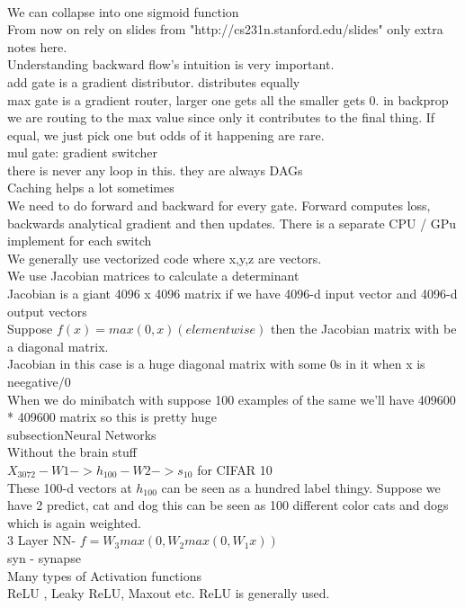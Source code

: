 \documentclass{article}
\begin{document}
\\
\\
\\
\\ \\ \\ \\
\\
\\
\\
\\
We can collapse into one sigmoid function
\\From now on rely on slides from "http://cs231n.stanford.edu/slides"
 only extra notes here.
\\ Understanding backward flow's intuition is very important.
\\ add gate is a gradient distributor. distributes equally
\\ max gate is a gradient router, larger one gets all the smaller gets 0. in backprop we are routing to the max value since only it contributes to the final thing. If equal, we just pick one but odds of it happening are rare.
\\ mul gate: gradient switcher
\\ there is never any loop in this. they are always DAGs
\\ Caching helps a lot sometimes
\\We need to do forward and backward for every gate. Forward computes loss, backwards analytical gradient and then updates. There is a separate CPU / GPu implement for each switch
\\ We generally use vectorized code where x,y,z are vectors. 
\\ We use Jacobian matrices to calculate a determinant
\\ Jacobian is a giant 4096 x 4096 matrix if we have 4096-d input vector and 4096-d output vectors
\\ Suppose $f(x)= max(0,x) (elementwise)$ then the Jacobian matrix with be a diagonal matrix.
\\ Jacobian in this case is a huge diagonal matrix with some 0s in it when x is neegative/0
\\ When we do minibatch with suppose 100 examples of the same we'll have 409600 * 409600 matrix so this is pretty huge
\\subsection{Neural Networks}
\\ Without the brain stuff
\\$X_{3072}  -W1-> h_{100} -W2-> s_{10}$ for CIFAR 10
\\ These 100-d vectors at $h_{100}$ can be seen as a hundred label thingy. Suppose we have 2 predict, cat and dog this can be seen as 100 different color cats and dogs which is again weighted.
\\ 3 Layer NN- $f= W_3 max(0, W_2 max(0, W_1 x))$
\\ syn - synapse
\\ Many types of Activation functions
\\ ReLU  , Leaky ReLU, Maxout etc. ReLU is generally used.
\end{document}
